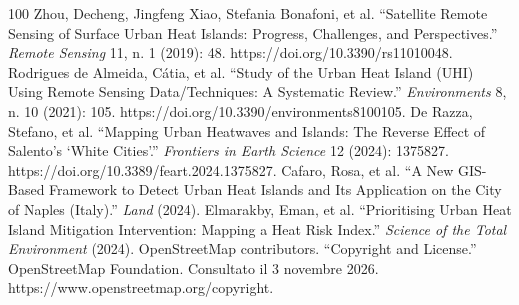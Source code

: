\begin{thebibliography}{100}
         Zhou, Decheng, Jingfeng Xiao, Stefania Bonafoni, et al. ``Satellite Remote Sensing of Surface Urban Heat Islands: Progress, Challenges, and Perspectives.'' \emph{Remote Sensing} 11, n. 1 (2019): 48. https://doi.org/10.3390/rs11010048.
         Rodrigues de Almeida, Cátia, et al. ``Study of the Urban Heat Island (UHI) Using Remote Sensing Data/Techniques: A Systematic Review.'' \emph{Environments} 8, n. 10 (2021): 105. https://doi.org/10.3390/environments8100105.
         De Razza, Stefano, et al. ``Mapping Urban Heatwaves and Islands: The Reverse Effect of Salento's `White Cities'.'' \emph{Frontiers in Earth Science} 12 (2024): 1375827. https://doi.org/10.3389/feart.2024.1375827.
         Cafaro, Rosa, et al. ``A New GIS-Based Framework to Detect Urban Heat Islands and Its Application on the City of Naples (Italy).'' \emph{Land} (2024).
         Elmarakby, Eman, et al. ``Prioritising Urban Heat Island Mitigation Intervention: Mapping a Heat Risk Index.'' \emph{Science of the Total Environment} (2024).
         OpenStreetMap contributors. ``Copyright and License.'' OpenStreetMap Foundation. Consultato il 3 novembre 2026. https://www.openstreetmap.org/copyright.
    \end{thebibliography}
